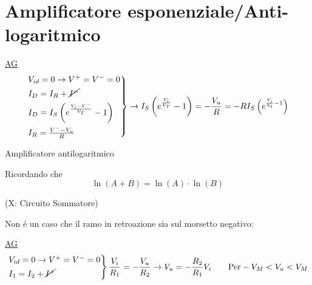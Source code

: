 \documentclass{article}
\begin{document}
\section{Amplificatore esponenziale/Anti-logaritmico}
\underline{AG}
\[
    \begin{rcases}
        V_{id} = 0 \rightarrow V^+ = V^- = 0\\
        I_D = I_R + \cancel{I^-}\\
        I_D = I_S \left(e^{\frac{V_i - V^-}{V_T}} -1 \right)\\
        I_R = \frac{V^- - V_u}{R}
    \end{rcases} \rightarrow
    I_S \left(e^{\frac{V_i}{V_T}}-1\right) = -\frac{V_u}{R} = -RI_S \left( e^{\frac{V_i}{V_t} -1}\right)
\]

Amplificatore antilogaritmico

Ricordando che
\[ \ln (A+B) = \ln(A) \cdot \ln(B) \]

(X: Circuito Sommatore)

Non \'e un caso che il ramo in retroazione sia sul morsetto negativo:

\begin{minipage}{0.45\textwidth}
\end{minipage}
\begin{minipage}{0.5\textwidth}
\end{minipage}

\underline{AG}
\[
    \begin{rcases}
        V_{id} = 0 \rightarrow V^+ = V^- = 0 \\
        I_1 = I_2 + \cancel{I^+}\\
    \end{rcases} \frac{V_i}{R_1} = -\frac{V_u}{R_2} \rightarrow V_u = -\frac{R_2}{R_1}V_i \qquad \text{Per} -V_M < V_u < V_M
\]
\end{document}
